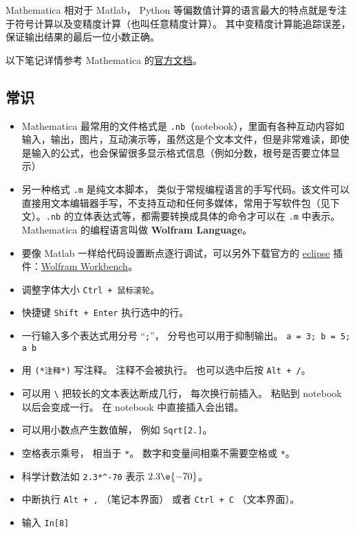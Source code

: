 

Mathematica 相对于 Matlab， Python 等偏数值计算的语言最大的特点就是专注于符号计算以及变精度计算（也叫任意精度计算）。 其中变精度计算能追踪误差， 保证输出结果的最后一位小数正确。

以下笔记详情参考 Mathematica 的\href{https://reference.wolfram.com/language/}{官方文档}。

\subsection{常识}
\begin{itemize}
\item Mathematica 最常用的文件格式是 \verb|.nb|（notebook），里面有各种互动内容如输入，输出，图片，互动演示等，虽然这是个文本文件，但是非常难读，即使是输入的公式，也会保留很多显示格式信息（例如分数，根号是否要立体显示）
\item 另一种格式 \verb|.m| 是纯文本脚本， 类似于常规编程语言的手写代码。该文件可以直接用文本编辑器手写，不支持互动和任何多媒体，常用于写软件包（见下文）。\verb|.nb| 的立体表达式等，都需要转换成具体的命令才可以在 \verb|.m| 中表示。 Mathematica 的编程语言叫做 \textbf{Wolfram Language}。
\item 要像 Matlab 一样给代码设置断点逐行调试，可以另外下载官方的 \href{https://www.eclipse.org/}{eclipse} 插件：\href{https://www.wolfram.com/workbench/}{Wolfram Workbench}。
\item 调整字体大小 \verb|Ctrl + 鼠标滚轮|。
\item 快捷键 \verb|Shift + Enter| 执行选中的行。
\item 一行输入多个表达式用分号 “\verb|;|”， 分号也可以用于抑制输出。 \verb|a = 3; b = 5; a b|
\item 用 \verb|(*注释*)| 写注释。 注释不会被执行。 也可以选中后按 \verb|Alt + /|。
\item 可以用 \verb|\| 把较长的文本表达断成几行， 每次换行前插入。 粘贴到 notebook 以后会变成一行。 在 notebook 中直接插入会出错。
\item 可以用小数点产生数值解， 例如 \verb|Sqrt[2.]|。
\item 空格表示乘号， 相当于 \verb|*|。 数字和变量间相乘不需要空格或 \verb|*|。
\item 科学计数法如 \verb|2.3*^-70| 表示 $2.3\e{-70}$。
\item 中断执行 \verb|Alt + ,| （笔记本界面） 或者 \verb|Ctrl + C| （文本界面）。
\item 输入 \verb|In[8]|
\end{itemize}

